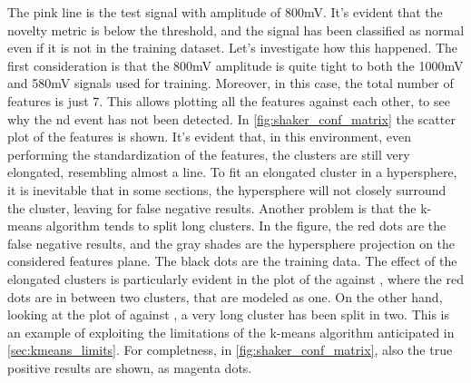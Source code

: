 The pink line is the test signal with amplitude of 800mV. It's evident that the novelty metric is below the threshold, and the signal has been classified as normal even if it is not in the training dataset. Let's investigate how this happened. The first consideration is that the 800mV amplitude is quite tight to both the 1000mV and 580mV signals used for training. Moreover, in this case, the total number of features is just 7. This allows plotting all the features against each other, to see why the \gls{nd} event has not been detected. In \autoref{fig:shaker_conf_matrix} the scatter plot of the features is shown. It's evident that, in this environment, even performing the standardization of the features, the clusters are still very elongated, resembling almost a line. To fit an elongated cluster in a hypersphere, it is inevitable that in some sections, the hypersphere will not closely surround the cluster, leaving  for false negative results. Another problem is that the k-means algorithm tends to split long clusters. In the figure, the red dots are the false negative results, and the gray shades are the hypersphere projection on the considered features plane. The black dots are the training data. The effect of the elongated clusters is particularly evident in the plot of the  against , where the red dots are in between two clusters, that are modeled as one. On the other hand, looking at the plot of  against , a very long cluster has been split in two. This is an example of exploiting the limitations of the k-means algorithm anticipated in \autoref{sec:kmeans_limits}. 
For completness, in \autoref{fig:shaker_conf_matrix}, also the true positive results are shown, as magenta dots.


